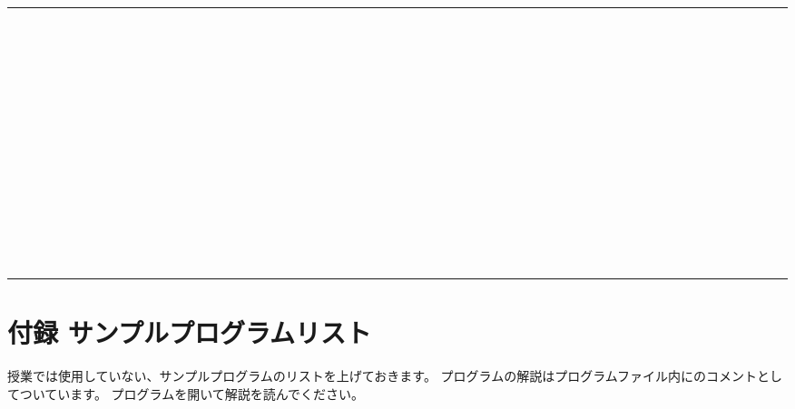 \documentclass[text08.tex]{subfiles}
\begin{document}
\begin{table}[htbp]
\begin{tabular}{|l|}
        　　　　　　　　　　　　　　　　　　　　　　　　　　　　　　　　　　　　　　　　　　　　　　　　　　　　　　　　　　　　　　　　\\
        　　　　　　　　　　　　　　　　　　　　　　　　　　　　　　　　　　　　　　　　　　　　　　　　　　　　　　　　　　　　　　　　\\
        　　　　　　　　　　　　　　　　　　　　　　　　　　　　　　　　　　　　　　　　　　　　　　　　　　　　　　　　　　　　　　　　\\
        　　　　　　　　　　　　　　　　　　　　　　　　　　　　　　　　　　　　　　　　　　　　　　　　　　　　　　　　　　　　　　　　\\
        　　　　　　　　　　　　　　　　　　　　　　　　　　　　　　　　　　　　　　　　　　　　　　　　　　　　　　　　　　　　　　　　\\
        　　　　　　　　　　　　　　　　　　　　　　　　　　　　　　　　　　　　　　　　　　　　　　　　　　　　　　　　　　　　　　　　\\
        　　　　　　　　　　　　　　　　　　　　　　　　　　　　　　　　　　　　　　　　　　　　　　　　　　　　　　　　　　　　　　　　\\
        　　　　　　　　　　　　　　　　　　　　　　　　　　　　　　　　　　　　　　　　　　　　　　　　　　　　　　　　　　　　　　　　\\
        　　　　　　　　　　　　　　　　　　　　　　　　　　　　　　　　　　　　　　　　　　　　　　　　　　　　　　　　　　　　　　　　\\
        　　　　　　　　　　　　　　　　　　　　　　　　　　　　　　　　　　　　　　　　　　　　　　　　　　　　　　　　　　　　　　　　\\
        　　　　　　　　　　　　　　　　　　　　　　　　　　　　　　　　　　　　　　　　　　　　　　　　　　　　　　　　　　　　　　　　\\
        　　　　　　　　　　　　　　　　　　　　　　　　　　　　　　　　　　　　　　　　　　　　　　　　　　　　　　　　　　　　　　　　\\
        \hline
    \end{tabular}
\end{table}



\bigskip

\clearpage\section{付録
サンプルプログラムリスト}
授業では使用していない、サンプルプログラムのリストを上げておきます。
プログラムの解説はプログラムファイル内にのコメントとしてついています。
プログラムを開いて解説を読んでください。
\end{document}
